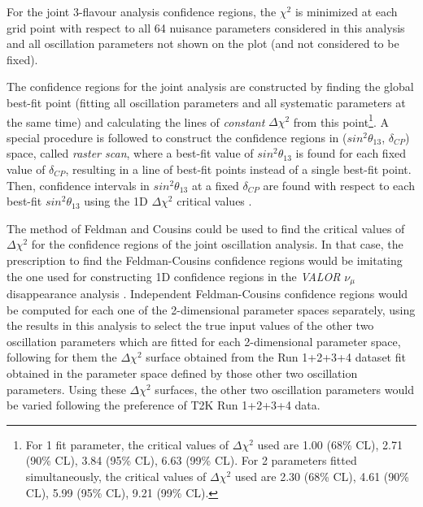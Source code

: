 For the joint 3-flavour analysis confidence regions,
the $\chi^2$ is minimized at each grid point with respect to all 64 nuisance parameters considered in this analysis
and all oscillation parameters not shown on the plot (and not considered to be fixed).

The confidence regions for the joint analysis are constructed by finding the global best-fit point
(fitting all oscillation parameters and all systematic parameters at the same time)
and calculating the lines of {\em constant} $\Delta{\chi^{2}}$ from this point\footnote{
For 1 fit parameter, the critical values of $\Delta{\chi^{2}}$ used are 
1.00 (68\% CL), 2.71 (90\% CL), 3.84 (95\% CL), 6.63 (99\% CL).
For 2 parameters fitted simultaneously, the critical values of $\Delta{\chi^{2}}$ used are 
2.30 (68\% CL), 4.61 (90\% CL), 5.99 (95\% CL), 9.21 (99\% CL).
}. A special procedure is followed 
to construct the confidence regions in ($sin^{2}\theta_{13}$, $\delta_{CP}$) space, called \textit{raster scan}, 
where a best-fit value of  $sin^{2}\theta_{13}$ is found for each fixed value of $\delta_{CP}$, resulting in a line
 of best-fit points instead of a single best-fit point. Then, confidence intervals in $sin^{2}\theta_{13}$
 at a fixed $\delta_{CP}$ are found with respect to each best-fit $sin^{2}\theta_{13}$ using the 1D
 $\Delta{\chi^{2}}$ critical values \cite{FeldmanCousins}.

The method of Feldman and Cousins could be used to find the critical values of $\Delta{\chi^{2}}$
for the confidence regions of the joint oscillation analysis.
In that case, the prescription to find the Feldman-Cousins confidence regions would be imitating the
one used for constructing 1D confidence regions in the {\em VALOR} $\nu_{\mu}$ disappearance analysis
\cite{OurRun1234DisappAnalysis3Flavour}. Independent Feldman-Cousins confidence regions would be
computed for each one of the 2-dimensional parameter spaces separately, using the results in this 
analysis to select the true input values of the other two oscillation parameters which are fitted for each
2-dimensional parameter space, following for them the $\Delta\chi^2$ surface obtained from the
Run 1+2+3+4 dataset fit obtained in the parameter space defined by those other two oscillation parameters.
Using these $\Delta\chi^2$ surfaces, the other two oscillation parameters would be varied following the
preference of T2K Run 1+2+3+4 data. 

